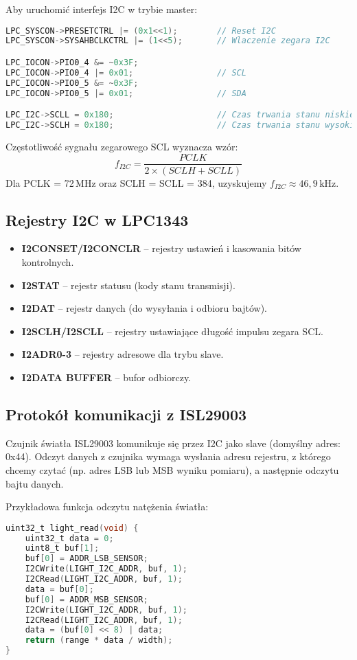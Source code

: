 \documentclass[a4paper,12pt]{report}
\begin{document}
Aby uruchomić interfejs I2C w trybie master:
\begin{lstlisting}[language=C]
LPC_SYSCON->PRESETCTRL |= (0x1<<1);        // Reset I2C
LPC_SYSCON->SYSAHBCLKCTRL |= (1<<5);       // Wlaczenie zegara I2C

LPC_IOCON->PIO0_4 &= ~0x3F;
LPC_IOCON->PIO0_4 |= 0x01;                 // SCL
LPC_IOCON->PIO0_5 &= ~0x3F;
LPC_IOCON->PIO0_5 |= 0x01;                 // SDA

LPC_I2C->SCLL = 0x180;                     // Czas trwania stanu niskiego SCL
LPC_I2C->SCLH = 0x180;                     // Czas trwania stanu wysokiego SCL
\end{lstlisting}

Częstotliwość sygnału zegarowego SCL wyznacza wzór:
\[
f_{I2C} = \frac{PCLK}{2 \times (SCLH + SCLL)}
\]
Dla PCLK = 72\,MHz oraz SCLH = SCLL = 384, uzyskujemy \(f_{I2C} \approx 46,9\,\mathrm{kHz}\).

\subsection*{Rejestry I2C w LPC1343}

\begin{itemize}
    \item \textbf{I2CONSET/I2CONCLR} – rejestry ustawień i kasowania bitów kontrolnych.
    \item \textbf{I2STAT} – rejestr statusu (kody stanu transmisji).
    \item \textbf{I2DAT} – rejestr danych (do wysyłania i odbioru bajtów).
    \item \textbf{I2SCLH/I2SCLL} – rejestry ustawiające długość impulsu zegara SCL.
    \item \textbf{I2ADR0-3} – rejestry adresowe dla trybu slave.
    \item \textbf{I2DATA BUFFER} – bufor odbiorczy.
\end{itemize}

\subsection*{Protokół komunikacji z ISL29003}

Czujnik światła ISL29003 komunikuje się przez I2C jako slave (domyślny adres: 0x44). Odczyt danych z czujnika wymaga wysłania adresu rejestru, z którego chcemy czytać (np. adres LSB lub MSB wyniku pomiaru), a następnie odczytu bajtu danych.

Przykładowa funkcja odczytu natężenia światła:
\begin{lstlisting}[language=C]
uint32_t light_read(void) {
    uint32_t data = 0;
    uint8_t buf[1];
    buf[0] = ADDR_LSB_SENSOR;
    I2CWrite(LIGHT_I2C_ADDR, buf, 1);
    I2CRead(LIGHT_I2C_ADDR, buf, 1);
    data = buf[0];
    buf[0] = ADDR_MSB_SENSOR;
    I2CWrite(LIGHT_I2C_ADDR, buf, 1);
    I2CRead(LIGHT_I2C_ADDR, buf, 1);
    data = (buf[0] << 8) | data;
    return (range * data / width);
}
\end{lstlisting}
\end{document}
